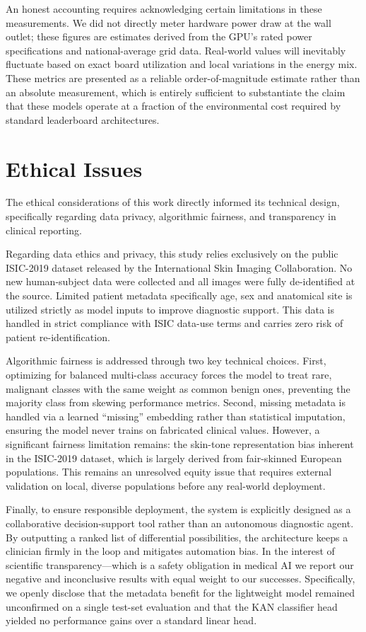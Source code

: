An honest accounting requires acknowledging certain limitations in these measurements. We did not directly meter hardware power draw at the wall outlet; these figures are estimates derived from the GPU's rated power specifications and national-average grid data. Real-world values will inevitably fluctuate based on exact board utilization and local variations in the energy mix. These metrics are presented as a reliable order-of-magnitude estimate rather than an absolute measurement, which is entirely sufficient to substantiate the claim that these models operate at a fraction of the environmental cost required by standard leaderboard architectures.



\section{Ethical Issues}

The ethical considerations of this work directly informed its technical design, specifically regarding data privacy, algorithmic fairness, and transparency in clinical reporting.

Regarding data ethics and privacy, this study relies exclusively on the public ISIC-2019 dataset released by the International Skin Imaging Collaboration. No new human-subject data were collected and all images were fully de-identified at the source. Limited patient metadata specifically age, sex and anatomical site is utilized strictly as model inputs to improve diagnostic support. This data is handled in strict compliance with ISIC data-use terms and carries zero risk of patient re-identification.

Algorithmic fairness is addressed through two key technical choices. First, optimizing for balanced multi-class accuracy forces the model to treat rare, malignant classes with the same weight as common benign ones, preventing the majority class from skewing performance metrics. Second, missing metadata is handled via a learned ``missing'' embedding rather than statistical imputation, ensuring the model never trains on fabricated clinical values. However, a significant fairness limitation remains: the skin-tone representation bias inherent in the ISIC-2019 dataset, which is largely derived from fair-skinned European populations. This remains an unresolved equity issue that requires external validation on local, diverse populations before any real-world deployment.

Finally, to ensure responsible deployment, the system is explicitly designed as a collaborative decision-support tool rather than an autonomous diagnostic agent. By outputting a ranked list of differential possibilities, the architecture keeps a clinician firmly in the loop and mitigates automation bias. In the interest of scientific transparency—which is a safety obligation in medical AI we report our negative and inconclusive results with equal weight to our successes. Specifically, we openly disclose that the metadata benefit for the lightweight model remained unconfirmed on a single test-set evaluation and that the KAN classifier head yielded no performance gains over a standard linear head.


